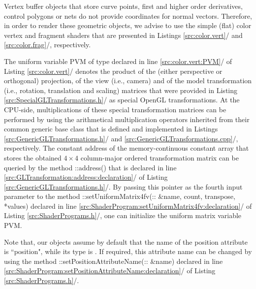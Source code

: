 \documentclass[b5paper, twosided]{book}
\newcommand{\CRed}[1]{{\color[rgb]{0.5, 0.0, 0.0}{#1}}}
\newcommand{\CBlue}[1]{{\color[rgb]{0.0, 0.0, 0.9}{#1}}}
\newcommand{\CPurple}[1]{{\color[rgb]{1.0, 0.0, 0.6}{#1}}}
\DeclareRobustCommand{\mref}[1]{\ref{#1}{\relsize{-1}/\pageref{#1}}}
\begin{document}
Vertex buffer objects that store curve points, first and higher order derivatives, control polygons or nets do not provide coordinates for normal vectors. Therefore, in order to render these geometric objects, we advise to use the simple (flat) color vertex and fragment shaders that are presented in Listings \mref{src:color.vert} and \mref{src:color.frag}, respectively. 


The uniform variable PVM of type \CRed{mat4} declared in line \mref{src:color.vert:PVM} of Listing \mref{src:color.vert} denotes the product of the (either perspective or orthogonal) projection, of the view (i.e., camera) and of the model transformation (i.e., rotation, translation and scaling) matrices that were provided in Listing \mref{src:SpecialGLTransformations.h} as special OpenGL transformations. At the CPU-side, multiplications of these special transformation matrices can be performed by using the arithmetical multiplication operators inherited from their common generic base class \CBlue{GLTransformation} that is defined and implemented in Listings \mref{src:GenericGLTransformations.h} and \mref{src:GenericGLTransformations.cpp}, respectively. The constant address of the memory-continuous constant \CRed{float} array that stores the obtained $4\times 4$ column-major ordered transformation matrix can be queried by the method \CBlue{GLTransformation}::address() that is declared in line \mref{src:GLTransformation:address:declaration} of Listing \mref{src:GenericGLTransformations.h}. By passing this pointer as the fourth input parameter to the method \CPurple{GLboolean} \CBlue{ShaderProgram}::setUniformMatrix4fv(\CRed{const std}::\CRed{string} \&name, \CPurple{GLsizei} count, \CPurple{GLboolean} transpose, \CRed{const} \CPurple{GLfloat} *values) declared in line \mref{src:ShaderProgram:setUniformMatrix4fv:declaration} of Listing \mref{src:ShaderPrograms.h}, one can initialize the uniform matrix variable PVM.

Note that, our \CBlue{ShaderProgram} objects assume by default that the name of the position attribute is ``position", while its type is \CRed{vec3}. If required, this attribute name can be changed by using the method \CPurple{GLvoid} \CBlue{ShaderProgram}::setPositionAttributeName(\CRed{const std}::\CRed{string} \&name) declared in line \mref{src:ShaderProgram:setPositionAttributeName:declaration} of Listing \mref{src:ShaderPrograms.h}.
\end{document}
